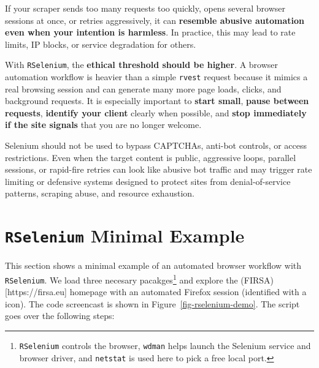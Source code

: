 \documentclass[
  letterpaper,
  DIV=11,
  numbers=noendperiod]{scrreprt}
\begin{document}
\begin{tcolorbox}[enhanced jigsaw, breakable, title=\textcolor{quarto-callout-warning-color}{\faExclamationTriangle}\hspace{0.5em}{A practical warning}, arc=.35mm, toprule=.15mm, rightrule=.15mm, leftrule=.75mm, bottomtitle=1mm, coltitle=black, toptitle=1mm, colbacktitle=quarto-callout-warning-color!10!white, colframe=quarto-callout-warning-color-frame, titlerule=0mm, bottomrule=.15mm, opacitybacktitle=0.6, left=2mm, colback=white, opacityback=0]

If your scraper sends too many requests too quickly, opens several
browser sessions at once, or retries aggressively, it can
\textbf{resemble abusive automation even when your intention is
harmless}. In practice, this may lead to rate limits, IP blocks, or
service degradation for others.

\end{tcolorbox}

With \texttt{RSelenium}, the \textbf{ethical threshold should be
higher}. A browser automation workflow is heavier than a simple
\texttt{rvest} request because it mimics a real browsing session and can
generate many more page loads, clicks, and background requests. It is
especially important to \textbf{start small}, \textbf{pause between
requests}, \textbf{identify your client} clearly when possible, and
\textbf{stop immediately if the site signals} that you are no longer
welcome.

Selenium should not be used to bypass CAPTCHAs, anti-bot controls, or
access restrictions. Even when the target content is public, aggressive
loops, parallel sessions, or rapid-fire retries can look like abusive
bot traffic and may trigger rate limiting or defensive systems designed
to protect sites from denial-of-service patterns, scraping abuse, and
resource exhaustion.

\section{\texorpdfstring{\texttt{RSelenium} Minimal
Example}{RSelenium Minimal Example}}\label{rselenium-minimal-example}

This section shows a minimal example of an automated browser workflow
with \texttt{RSelenium}. We load three necesary pacakges\footnote{\texttt{RSelenium}
  controls the browser, \texttt{wdman} helps launch the Selenium service
  and browser driver, and \texttt{netstat} is used here to pick a free
  local port.} and explore the (FIRSA){[}https://firsa.eu{]} homepage
with an automated Firefox session (identified with a 🤖 icon). The code
screencast is shown in Figure~\ref{fig-rselenium-demo}. The script goes
over the following steps:
\end{document}
